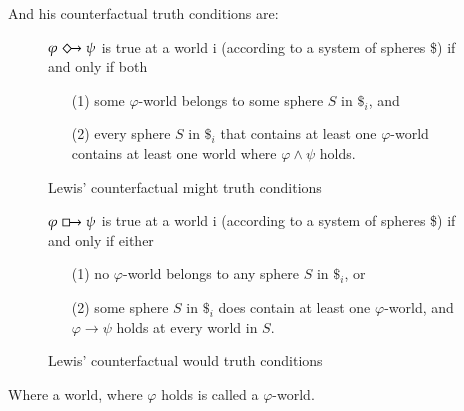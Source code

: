 \documentclass[a4paper,american]{paper}
\theoremstyle{definition}\newtheorem{definition}{Definition}
\begin{document}
\noindent And his counterfactual truth conditions are:
\begin{figure}[H]
	\centering
	$\varphi\Diamondright\psi$ is true at a world i (according to a system of spheres \$) if and only if both
	\begin{itemize}
	\item[(1)] some $\varphi$-world belongs to some sphere $S$ in $\$_i$, and
	\item[(2)] every sphere $S$ in $\$_i$ that contains at least one $\varphi$-world contains at least one world where $\varphi\wedge\psi$ holds.
	\end{itemize}
	\caption{Lewis' counterfactual might truth conditions}
	\label{fig:counterfactual_might}
\end{figure}
\begin{figure}[H]
	\centering
	$\varphi\boxright\psi$ is true at a world i (according to a system of spheres \$) if and only if either
	\begin{itemize}
	\item[(1)] no $\varphi$-world belongs to any sphere $S$ in $\$_i$, or
	\item[(2)] some sphere $S$ in $\$_i$ does contain at least one $\varphi$-world, and $\varphi\rightarrow\psi$ holds at every world in $S$.
	\end{itemize}
	\caption{Lewis' counterfactual would truth conditions}
	\label{fig:counterfactual_would}
\end{figure}
Where a world, where $\varphi$ holds is called a $\varphi$-world.

\nocite{*}

\end{document}
